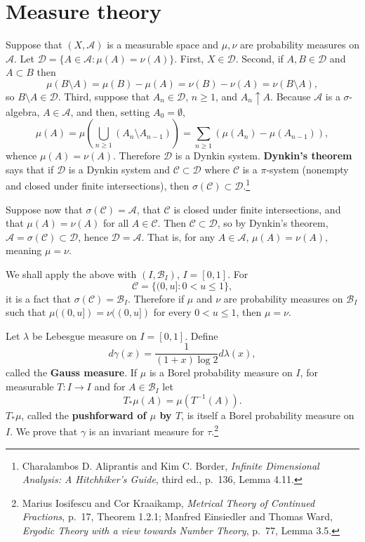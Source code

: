 \documentclass{article}
\theoremstyle{definition}
\begin{document}
\section{Measure theory}
Suppose that $(X,\mathscr{A})$ is a measurable space and $\mu,\nu$ are probability measures on $\mathscr{A}$.
Let
$\mathscr{D} = \{A \in \mathscr{A}: \mu(A)=\nu(A)\}$. 
First, $X \in \mathscr{D}$.  Second, if $A,B \in \mathscr{D}$ and $A \subset B$ then
\[
\mu(B \setminus A) = \mu(B)-\mu(A) = \nu(B)-\nu(A) = \nu(B \setminus A),
\]
so $B \setminus A \in \mathscr{D}$. Third,
suppose that $A_n \in \mathscr{D}$, $n \geq 1$, and $A_n \uparrow A$. Because $\mathscr{A}$ is a $\sigma$-algebra, $A \in \mathscr{A}$,
and then, setting $A_0 = \emptyset$,
\[
\mu(A) = \mu\left( \bigcup_{n \geq 1} (A_n \setminus A_{n-1}) \right) = \sum_{n \geq 1} (\mu(A_n)-\mu(A_{n-1})),
\]
whence $\mu(A)=\nu(A)$. Therefore $\mathscr{D}$ is a Dynkin system. 
\textbf{Dynkin's theorem} says that if $\mathscr{D}$ is a Dynkin system and
$\mathscr{C} \subset \mathscr{D}$ where $\mathscr{C}$ is a $\pi$-system (nonempty and closed under finite intersections),
then $\sigma(\mathscr{C}) \subset \mathscr{D}$.\footnote{Charalambos D. Aliprantis and Kim C. Border,
{\em Infinite Dimensional Analysis: A Hitchhiker's Guide},
third ed., p.~136, Lemma 4.11.}


Suppose now that $\sigma(\mathscr{C})=\mathscr{A}$, that
$\mathscr{C}$ is closed under finite intersections,
and that $\mu(A)=\nu(A)$ for all $A \in \mathscr{C}$.
Then $\mathscr{C} \subset \mathscr{D}$, so by Dynkin's theorem,
$\mathscr{A} =\sigma(\mathscr{C}) \subset \mathscr{D}$, hence
$\mathscr{D}=\mathscr{A}$. That is, for any $A \in \mathscr{A}$, $\mu(A)=\nu(A)$, meaning $\mu=\nu$. 

We shall apply the above  with $(I,\mathscr{B}_I)$, $I=[0,1]$. For
\[
\mathscr{C} = \{(0,u]: 0<u \leq 1\},
\]
it is a fact that
$\sigma(\mathscr{C})=\mathscr{B}_I$. Therefore if $\mu$ and $\nu$ are probability measures on
$\mathscr{B}_I$ such that $\mu((0,u])=\nu((0,u])$ for every $0<u \leq 1$, then
$\mu=\nu$. 


Let $\lambda$ be Lebesgue measure on $I=[0,1]$. Define
\[
d\gamma(x) = \frac{1}{(1+x)\log 2} d\lambda(x),
\]
called the \textbf{Gauss measure}. 
If $\mu$ is a Borel probability measure on $I$,
for measurable $T:I \to I$ and
for $A \in \mathscr{B}_I$ let
\[
T_* \mu (A) = \mu(T^{-1}(A)).
\]
$T_*\mu$, called the \textbf{pushforward of $\mu$ by $T$}, is itself a Borel probability measure on $I$. 
We prove that $\gamma$ is an invariant measure for $\tau$.\footnote{Marius Iosifescu and Cor Kraaikamp,
{\em Metrical Theory of Continued Fractions}, p.~17, Theorem 1.2.1;
Manfred Einsiedler and Thomas Ward, {\em Ergodic Theory with a view towards Number Theory}, 
p.~77, Lemma 3.5.}
\end{document}
